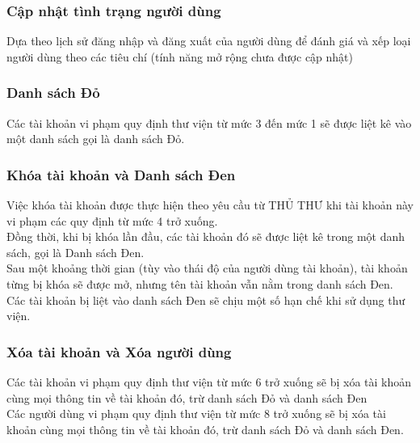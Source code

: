 \documentclass[12pt,a4paper]{report}
\begin{document}
            \subsubsection{Cập nhật tình trạng người dùng}
            Dựa theo lịch sử đăng nhập và đăng xuất của người dùng để đánh giá và xếp loại người dùng theo các tiêu chí (tính năng mở rộng chưa được cập nhật)\\ %

            \subsubsection{Danh sách Đỏ}
            Các tài khoản vi phạm quy định thư viện từ mức 3 đến mức 1 sẽ được liệt kê vào một danh sách gọi là danh sách Đỏ.\\

            \subsubsection{Khóa tài khoản và Danh sách Đen}
            Việc khóa tài khoản được thực hiện theo yêu cầu từ THỦ THƯ khi tài khoản này vi phạm các quy định từ mức 4 trở xuống.\\
            Đồng thời, khi bị khóa lần đầu, các tài khoản đó sẽ được liệt kê trong một danh sách, gọi là Danh sách Đen.\\
            Sau một khoảng thời gian (tùy vào thái độ của người dùng tài khoản), tài khoản từng bị khóa sẽ được mở, nhưng tên tài khoản vẫn nằm trong danh sách Đen.\\
            Các tài khoản bị liệt vào danh sách Đen sẽ chịu một số hạn chế khi sử dụng thư viện.\\

            \subsubsection{Xóa tài khoản và Xóa người dùng}
            Các tài khoản vi phạm quy định thư viện từ mức 6 trở xuống sẽ bị xóa tài khoản cùng mọi thông tin về tài khoản đó, trừ danh sách Đỏ và danh sách Đen\\
            Các người dùng vi phạm quy định thư viện từ mức 8 trở xuống sẽ bị xóa tài khoản cùng mọi thông tin về tài khoản đó, trừ danh sách Đỏ và danh sách Đen.\\
    \newpage
\end{document}
